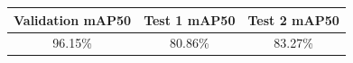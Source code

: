 \begin{tabular}{ccc}
\toprule
Validation mAP50 & Test 1 mAP50 & Test 2 mAP50 \\
\midrule
96.15\% & 80.86\% & 83.27\% \\
\bottomrule
\end{tabular}

